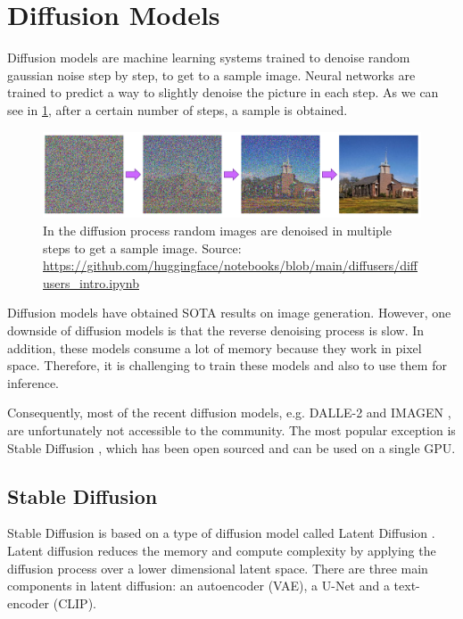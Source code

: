 \section{Diffusion Models} \label{sec:diffusion_models}

Diffusion models are machine learning systems trained to denoise random gaussian noise step by step, to get to a sample image. Neural networks are trained to predict a way to slightly denoise the picture in each step. As we can see in \cref{fig:diffusion_process}, after a certain number of steps, a sample is obtained.

\begin{figure}[ht]
    \centering
    \includegraphics[width=\linewidth]{images/diffusion-process.png}
    \caption{In the diffusion process random images are denoised in multiple steps to get a sample image. Source: \url{https://github.com/huggingface/notebooks/blob/main/diffusers/diffusers_intro.ipynb}}
    \label{fig:diffusion_process}
\end{figure}

Diffusion models have obtained SOTA results on image generation. However, one downside of diffusion models is that the reverse denoising process is slow. In addition, these models consume a lot of memory because they work in pixel space. Therefore, it is challenging to train these models and also to use them for inference.

Consequently, most of the recent diffusion models, e.g. DALLE-2 \cite{ramesh2022hierarchical} and IMAGEN \cite{saharia2022photorealistic}, are unfortunately not accessible to the community. The most popular exception is Stable Diffusion \cite{rombach2021highresolution}, which has been open sourced and can be used on a single GPU.

\subsection{Stable Diffusion}

Stable Diffusion is based on a type of diffusion model called Latent Diffusion \cite{rombach2021highresolution}. Latent diffusion reduces the memory and compute complexity by applying the diffusion process over a lower dimensional latent space. There are three main components in latent diffusion: an autoencoder (VAE), a U-Net and a text-encoder (CLIP).


